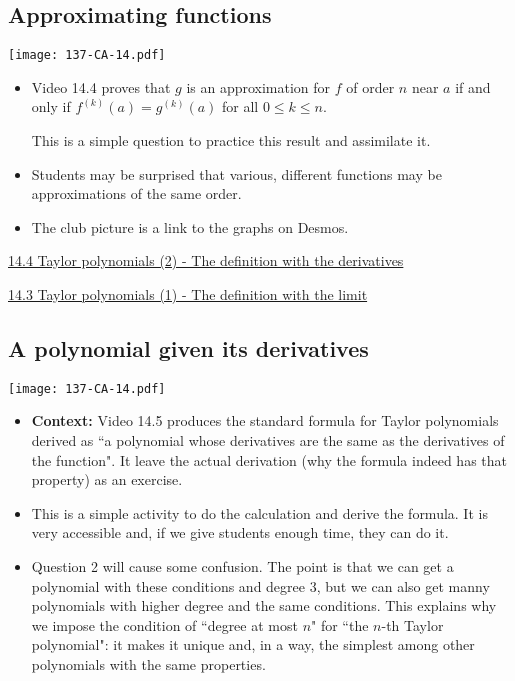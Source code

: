\documentclass[11pt]{article}
\newcommand{\nl}{\hfill \vspace{-1.1\baselineskip}} %
\newcommand{\viii}{\hspace{8mm}  \href{https://www.youtube.com/watch?v=aCFR5CABSA0&list=PLlwePzQY_wW9h32ZwS6CYsY4eR_b2pE9j&index=3}{14.3 Taylor polynomials (1) - The definition with the limit}}
\newcommand{\viv}{\hspace{8mm}  \href{https://www.youtube.com/watch?v=sNWY1w8YocM&list=PLlwePzQY_wW9h32ZwS6CYsY4eR_b2pE9j&index=4}{14.4 Taylor polynomials (2) - The definition with the derivatives}}
\begin{document}
\newpage
\subsection{Approximating functions}

\begin{center}
{ \texttt{[image: 137-CA-14.pdf]}} 
\end{center}

\begin{comments}
\nl
	\begin{itemize}
		\item Video 14.4 proves that $g$ is an approximation for $f$ of order $n$ near $a$ if and only if  $f^{(k)}(a) = g^{(k)}(a)$ for all $0 \leq k \leq n$.
		
		This is a simple question to practice this result and assimilate it.
		
		\item Students may be surprised that various, different functions may be  approximations of the same order.
		
		\item The club picture is a link to the graphs on Desmos.
	\end{itemize}
\end{comments}

\begin{videos}
\viv

\viii
\end{videos}

\newpage
\subsection{A polynomial given its derivatives}

\begin{center}
{ \texttt{[image: 137-CA-14.pdf]}} 
\end{center}

\begin{comments}
\nl
	\begin{itemize}
		\item {\bf Context:}  Video 14.5 produces the standard formula for Taylor polynomials derived as ``a polynomial whose derivatives are the same as the derivatives of the function".  It leave the actual derivation (why the formula indeed has that property) as an exercise.
		
		\item This is a simple activity to do the calculation and derive the formula.  It is very accessible and, if we give students enough time, they can do it.

		\item Question 2 will cause some confusion.  The point is that we can get a polynomial with these conditions and degree $3$, but we can also get manny polynomials with higher degree and the same conditions.  This explains why we impose the condition of ``degree at most $n$" for ``the $n$-th Taylor polynomial":  it makes it unique and, in a way, the simplest among other polynomials with the same properties.
	\end{itemize}
\end{comments}
\end{document}
